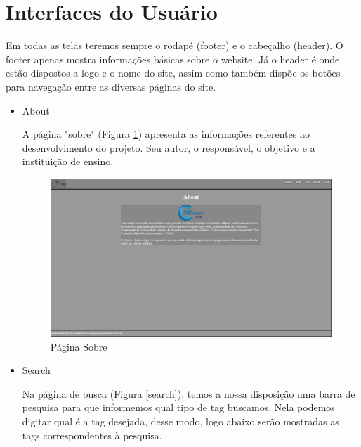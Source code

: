 \section{Interfaces do Usuário}
    Em todas as telas teremos sempre o rodapé (footer) e o cabeçalho (header). O footer apenas mostra informações básicas sobre o website. Já o header é onde estão dispostos a logo e o nome do site, assim como também dispõe os botões para navegação entre as diversas páginas do site.
    \begin{itemize}
        \item About

            A página "sobre" (Figura \ref{about}) apresenta as informações referentes ao desenvolvimento do projeto. Seu autor, o responsável, o objetivo e a instituição de ensino.
            \begin{figure}[H]
                \begin{center}
                    \includegraphics[width=12cm]{Pictures/JV/Interfaces/About.png}
                    \caption{Página Sobre} \label{about}
                \end{center}
            \end{figure}
        \item Search

            Na página de busca (Figura \ref{search}), temos a nossa disposição uma barra de pesquisa para que informemos qual tipo de tag buscamos. Nela podemos digitar qual é a tag desejada, desse modo, logo abaixo serão mostradas as tags correspondentes à pesquisa.
            

\end{itemize}
